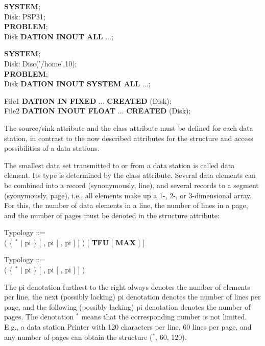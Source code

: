 \begin{removed}
{\bf SYSTEM};\\
\x Disk: PSP31; \\
{\bf PROBLEM};\\
 Disk {\bf DATION INOUT ALL} ...;\\
\end{removed}
\begin{accepted}
{\bf SYSTEM};\\
\x Disk: Disc('/home',10);\\
{\bf PROBLEM};\\
 Disk {\bf DATION INOUT SYSTEM ALL} ...;\\
\end{accepted}
 File1 {\bf DATION IN FIXED} ... {\bf CREATED} (Disk);\\
 File2 {\bf DATION INOUT FLOAT} ... {\bf CREATED} (Disk);

The source/sink attribute and the class attribute must be defined for
each data station, in contrast to the now described attributes for the
structure and access possibilities of a data stations.

The smallest data set transmitted to or from a data station is called
data element. Its type is determined by the class attribute. Several
data elements can be combined into a record (synonymously, line), and
several records to a segment (syonymously, page), i.e., all elements
make up a 1-, 2-, or 3-dimensional array. For this, the number of data
elements in a line, the number of lines in a page, and the number of
pages must be denoted in the structure attribute:

\begin{removed}
Typology ::= \\
 ( \{ $^*$ $\mid$ pi \} [ , pi [ , pi ] ] ) [ {\bf TFU} [ {\bf MAX} ] ]
\end{removed}
\begin{accepted}
Typology ::= \\
 ( \{ $^*$ $\mid$ pi \} [ , pi [ , pi ] ] ) 
\end{accepted}

The pi denotation furthest to the right always denotes the number of
elements per line, the next (possibly lacking) pi denotation denotes
the number of lines per page, and the following (possibly lacking) pi
denotation denotes the number of pages. The denotation $^*$ means that
the corresponding number is not limited. E.g., a data station Printer
with 120 characters per line, 60 lines per page, and any number of pages
can obtain the structure ($^*$, 60, 120).

